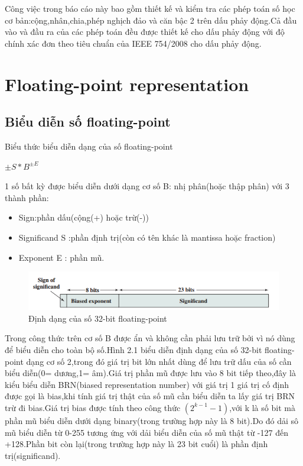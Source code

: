 \documentclass[11pt,a4paper,vietnamese]{report}
\begin{document}
Công việc trong báo cáo này bao gồm thiết kế và kiểm tra các phép toán số học cơ bản:cộng,nhân,chia,phép nghịch đảo và căn bậc 2 trên dấu phảy động.Cả đầu vào và đầu ra của các phép toán đều được thiết kế cho dấu phảy động với độ chính xác đơn theo tiêu chuẩn của IEEE 754/2008 cho dấu phảy động.
\chapter{Floating-point representation}

\section{Biểu diễn số floating-point}
Biểu thức biểu diễn dạng của số floating-point
\begin{center}
{$\pm{S}*B^{\pm{E}}$}\\
\end{center}
 1 số bất kỳ được biểu diễn dưới dạng cơ số B: nhị phân(hoặc thập phân) với 3 thành phần:
\begin{itemize}
\item Sign:phần dấu(cộng(+) hoặc trừ(-))
\item Significand S :phần định trị(còn có tên khác là mantissa hoặc fraction)
\item Exponent E : phần mũ.
\end{itemize}
\begin{center}
  \begin{figure}[htp]
  \begin{center}
  \includegraphics[scale=0.7]{image/fig1.png}
  \end{center}
  \caption{Định dạng của số 32-bit floating-point}
  \label{reffig1.png}
  \end{figure}
\end{center}
Trong công thức trên cơ số B được ẩn và không cần phải lưu trữ bởi vì nó dùng để biểu diễn cho toàn bộ số.Hình 2.1 biểu diễn định dạng của số 32-bit floating-point dạng cơ số 2,trong đó giá trị bit lớn nhất dùng để lưu trữ dấu của số cần biểu diễn(0= dương,1= âm).Giá trị phần mũ được lưu vào 8  bit tiếp theo,đây là kiểu biểu diễn BRN(biased representation number) với giá trị 1 giá trị cố định được gọi là bias,khi tính giá trị thật của số mũ cần biểu diễn ta lấy giá trị BRN trừ đi bias.Giá trị bias được tính theo công thức $(2^{k-1}-1)$,với k là số bit mà phần mũ biểu diễn dưới dạng binary(trong trường hợp này là 8 bit).Do đó dải sô mũ biểu diễn từ 0-255 tương ứng với dải biểu diễn của số mũ thật từ -127 đến +128.Phần bit còn lại(trong trường hợp này là 23 bit cuổi) là phần định trị(significand).
\end{document}
